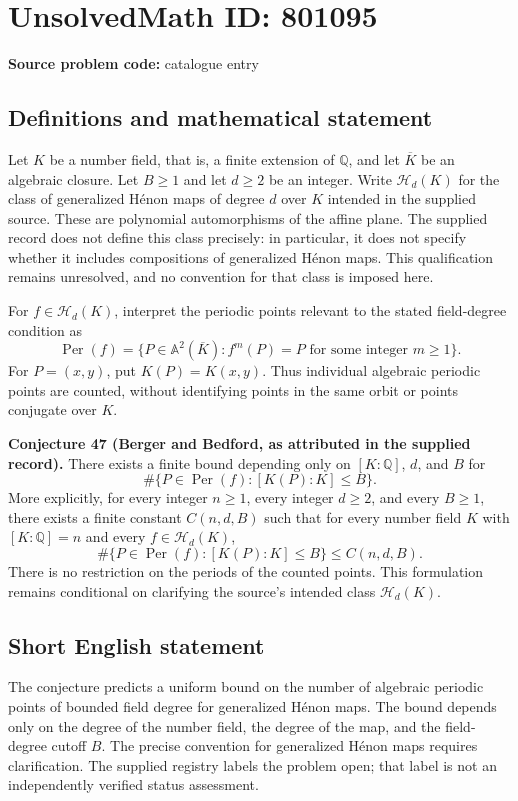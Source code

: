 \documentclass[11pt]{article}
\newcommand{\Q}{\mathbb{Q}}
\newcommand{\A}{\mathbb{A}}
\begin{document}
\section*{UnsolvedMath ID: 801095}
\textbf{Source problem code:} catalogue entry
\subsection{Definitions and mathematical statement}
Let \(K\) be a number field, that is, a finite extension of \(\Q\), and let \(\overline K\) be an algebraic closure. Let \(B\geq 1\) and let \(d\geq 2\) be an integer. Write \(\mathcal H_d(K)\) for the class of generalized H\'{e}non maps of degree \(d\) over \(K\) intended in the supplied source. These are polynomial automorphisms of the affine plane. The supplied record does not define this class precisely: in particular, it does not specify whether it includes compositions of generalized H\'{e}non maps. This qualification remains unresolved, and no convention for that class is imposed here.

For \(f\in\mathcal H_d(K)\), interpret the periodic points relevant to the stated field-degree condition as
\[
\operatorname{Per}(f)=\{P\in\A^2(\overline K): f^m(P)=P\text{ for some integer }m\geq 1\}.
\]
For \(P=(x,y)\), put \(K(P)=K(x,y)\). Thus individual algebraic periodic points are counted, without identifying points in the same orbit or points conjugate over \(K\).

\textbf{Conjecture 47 (Berger and Bedford, as attributed in the supplied record).} There exists a finite bound depending only on \([K:\Q]\), \(d\), and \(B\) for
\[
\#\{P\in\operatorname{Per}(f):[K(P):K]\leq B\}.
\]
More explicitly, for every integer \(n\geq 1\), every integer \(d\geq 2\), and every \(B\geq 1\), there exists a finite constant \(C(n,d,B)\) such that for every number field \(K\) with \([K:\Q]=n\) and every \(f\in\mathcal H_d(K)\),
\[
\#\{P\in\operatorname{Per}(f):[K(P):K]\leq B\}\leq C(n,d,B).
\]
There is no restriction on the periods of the counted points. This formulation remains conditional on clarifying the source's intended class \(\mathcal H_d(K)\).
\subsection{Short English statement}
The conjecture predicts a uniform bound on the number of algebraic periodic points of bounded field degree for generalized H\'{e}non maps. The bound depends only on the degree of the number field, the degree of the map, and the field-degree cutoff \(B\). The precise convention for generalized H\'{e}non maps requires clarification. The supplied registry labels the problem open; that label is not an independently verified status assessment.
\end{document}
